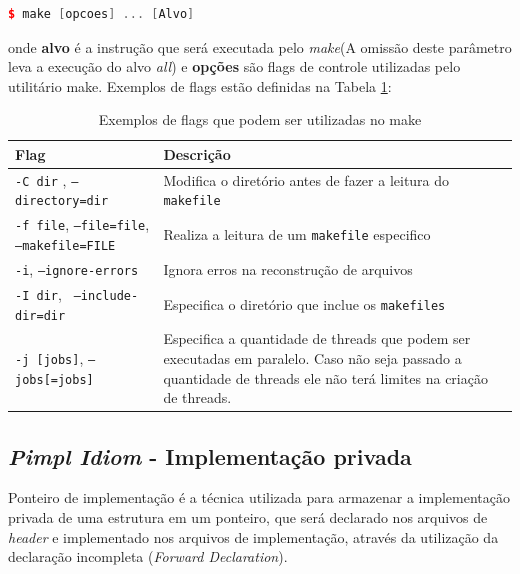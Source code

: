     \begin{lstlisting}[language=C++,caption={ 
                                             Utilizando o programa make},
                                                         label=codigo_26]
        $ make [opcoes] ... [Alvo]

    \end{lstlisting}


onde \textbf{alvo} é a instrução que será executada pelo \textit{make}(A omissão deste
parâmetro leva a execução do alvo \textit{all}) e \textbf{opções} são flags de controle
 utilizadas pelo utilitário make. Exemplos de flags estão definidas na Tabela \ref{tab:tabela_05}:

\begin{table}[h]
    \centering
    \caption {Exemplos de flags que podem ser utilizadas no make}
    \label{tab:tabela_05}
    \begin{tabular}{ lp{8cm}}
    \toprule
    \textbf{Flag} & \textbf{Descrição}\\
    \midrule
    \texttt{-C dir} , \texttt{--directory=dir} & Modifica o diretório antes de fazer a leitura do \texttt{makefile}\\
    \midrule
    \texttt{-f file}, \texttt{--file=file}, \texttt{--makefile=FILE} & Realiza a leitura de um \texttt{makefile} especifico\\
    \midrule
    \texttt{-i}, \texttt{--ignore-errors} & Ignora erros na reconstrução de arquivos\\
    \midrule
    \texttt{-I dir}, \texttt{ --include-dir=dir} & Especifica o diretório que inclue os \texttt{makefiles}\\
    \midrule
    \texttt{-j [jobs]}, \texttt{--jobs[=jobs]} & Especifica a quantidade de threads
                                 que podem ser executadas em paralelo. 
                                 Caso não seja passado a quantidade de
                                 threads ele não terá limites na criação
                                 de threads.\\
    \bottomrule
    \end{tabular}
\end{table}


\subsection{\textit{Pimpl Idiom} - Implementação privada} \label{Pimpl_Idiom}

Ponteiro de implementação é a técnica utilizada para armazenar a
 implementação privada de uma estrutura em um ponteiro, que será
 declarado nos arquivos de \textit{header} e implementado nos arquivos de
 implementação, através da utilização da declaração incompleta 
 (\textit{Forward Declaration}).

